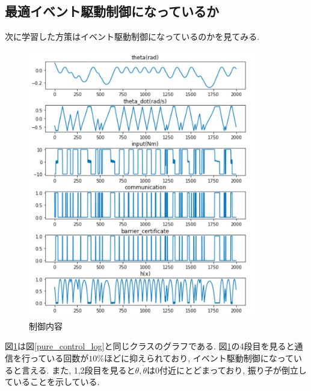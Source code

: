 \documentclass{jsarticle}
\begin{document}
\subsection{最適イベント駆動制御になっているか}
次に学習した方策はイベント駆動制御になっているのかを見てみる. \par
\begin{figure}[h]
	\centering
 	\includegraphics[width=10cm]{control_log.png}
 	\caption{制御内容} \label{control_log}
\end{figure}
図\ref{control_log}は図\ref{pure_control_log}と同じクラスのグラフである. 図\ref{control_log}の4段目を見ると通信を行っている回数が$10\%$ほどに抑えられており, イベント駆動制御になっていると言える. また, 1,2段目を見ると$\theta, \dot{\theta}$は0付近にとどまっており, 振り子が倒立していることを示している.\par

\newpage
\end{document}
